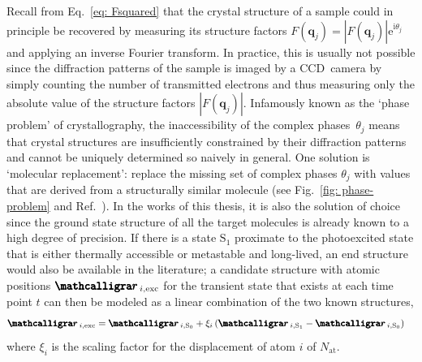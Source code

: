 Recall from Eq.~\eqref{eq: Fsquared} that the crystal structure of a sample
could in principle be recovered by measuring its structure factors
$F(\boldsymbol{q}_j) = |F(\boldsymbol{q}_j)| \text{e}^{\text{i} \theta_j}$
and applying an inverse Fourier transform.
%
In practice, this is usually not possible
since the diffraction patterns of the sample is imaged by a CCD~camera
by simply counting the number of transmitted electrons and thus measuring only
the absolute value of the structure factors $|F(\boldsymbol{q}_j)|$.
%
Infamously known as the `phase problem' of crystallography,
the inaccessibility of the complex phases~$\theta_j$ means that
crystal structures are insufficiently constrained by their diffraction patterns
and cannot be uniquely determined so naively in general.
%
One solution is `molecular replacement':
replace the missing set of complex phases $\theta_j$ with values that
are derived from a structurally similar molecule (see Fig.~\ref{fig: phase-problem}
and Ref.~\cite{Taylor2003}).
%
In the works of this thesis, it is also the solution of choice since
the ground state structure of all the target molecules is already known
to a high degree of precision.
%
If there is a state $\text{S}_1$ proximate to the photoexcited state
that is either thermally accessible or metastable and long-lived,
an end structure would also be available in the literature;
a candidate structure with atomic positions $\bscriptr_{i, \text{exc}}$ for the transient state
that exists at each time point $t$ can then be modeled as a linear combination
of the two known structures,
%
\begin{equation}
  \begin{aligned}
    \bscriptr_{i, \text{exc}} & = \bscriptr_{i, \text{S}_0}
      + \xi_i \left( \bscriptr_{i, \text{S}_1} - \bscriptr_{i, \text{S}_0} \right)
  \end{aligned}
  \label{eq: linear-model}
\end{equation}
%
where $\xi_i$ is the scaling factor for the displacement of atom $i$ of $N_\text{at}$.

